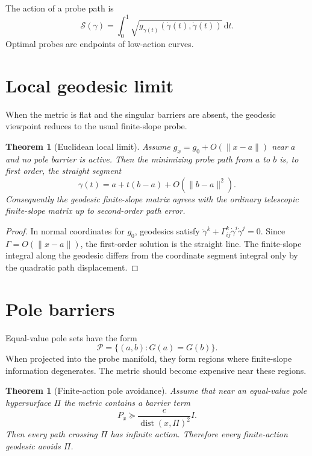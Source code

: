 \documentclass[11pt]{article}
\newtheorem{theorem}[definition]{Theorem}
\DeclareMathOperator{\dist}{dist}
\newcommand{\dd}{\mathrm{d}}
\begin{document}
The action of a probe path is
\begin{equation}
    \mathcal S(\gamma)=\int_0^1 \sqrt{g_{\gamma(t)}(\dot\gamma(t),\dot\gamma(t))}\,\dd t.
\end{equation}
Optimal probes are endpoints of low-action curves.

\section{Local geodesic limit}
When the metric is flat and the singular barriers are absent, the geodesic viewpoint reduces to the usual finite-slope probe.

\begin{theorem}[Euclidean local limit]
Assume $g_x=g_0+O(\|x-a\|)$ near $a$ and no pole barrier is active. Then the minimizing probe path from $a$ to $b$ is, to first order, the straight segment
\begin{equation}
    \gamma(t)=a+t(b-a)+O(\|b-a\|^2).
\end{equation}
Consequently the geodesic finite-slope matrix agrees with the ordinary telescopic finite-slope matrix up to second-order path error.
\end{theorem}

\begin{proof}
In normal coordinates for $g_0$, geodesics satisfy $\ddot\gamma^k+\Gamma^k_{ij}\dot\gamma^i\dot\gamma^j=0$. Since $\Gamma=O(\|x-a\|)$, the first-order solution is the straight line. The finite-slope integral along the geodesic differs from the coordinate segment integral only by the quadratic path displacement.
\end{proof}

\section{Pole barriers}
Equal-value pole sets have the form
\begin{equation}
    \mathcal P=\{(a,b):G(a)=G(b)\}.
\end{equation}
When projected into the probe manifold, they form regions where finite-slope information degenerates. The metric should become expensive near these regions.

\begin{theorem}[Finite-action pole avoidance]
Assume that near an equal-value pole hypersurface $\Pi$ the metric contains a barrier term
\begin{equation}
    P_x \succeq \frac{c}{\dist(x,\Pi)^2} I.
\end{equation}
Then every path crossing $\Pi$ has infinite action. Therefore every finite-action geodesic avoids $\Pi$.
\end{theorem}
\end{document}
